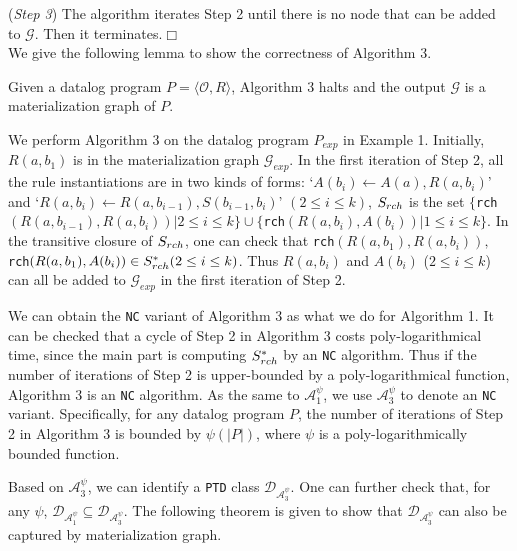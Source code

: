 \documentclass{article}
\begin{document}
(\emph{Step 3}) The algorithm iterates Step 2 until there is no node that can be added to $\mathcal{G}$. Then it terminates.\hfill$\Box$\\

We give the following lemma to show the correctness of Algorithm 3.

\begin{lemma}
Given a datalog program $P=\langle\mathcal{O}, R\rangle$, Algorithm 3 halts and the output $\mathcal{G}$ is a materialization graph of $P$.
\end{lemma}

\begin{example}
We perform Algorithm 3 on the datalog program $P_{exp}$ in Example 1. Initially, $R(a,b_1)$ is in the materialization graph $\mathcal{G}_{exp}$. In the first iteration of Step 2, all the rule instantiations are in two kinds of forms: `$A(b_{i})\leftarrow A(a),R(a,b_{i})$' and `$R(a,b_i)\leftarrow R(a,b_{i-1}),S(b_{i-1},b_i)$' $(2\leq i\leq k)$, $S_{\tiny rch}$ is the set $\{$\texttt{rch}$(R(a,b_{i-1}), R(a,b_i))|2\leq i\leq k\}\cup\{$\texttt{rch}$(R(a,b_i), A(b_i))|1\leq i\leq k\}$. In the transitive closure of $S_{\tiny rch}$,
one can check that \texttt{rch}$(R(a,b_1), R(a,b_i)),$\texttt{rch}$(R(a,b_1), A(b_i))\in S^*_{\tiny rch}(2\leq i\leq k)$. Thus $R(a,b_i)$ and $A(b_i)$ ($2\leq i\leq k$) can all be added to $\mathcal{G}_{exp}$ in the first iteration of Step 2.
\end{example}

We can obtain the \texttt{NC} variant of Algorithm 3 as what we do for Algorithm 1. It can be checked that a cycle
of Step 2 in Algorithm 3 costs poly-logarithmical time, since the main part is computing $S^*_{\tiny rch}$ by an \texttt{NC} algorithm. Thus if the number of iterations of Step 2 is upper-bounded by a poly-logarithmical function,
Algorithm 3 is an \texttt{NC} algorithm. As the same to $\mathcal{A}_1^{\psi}$, we use $\mathcal{A}_3^{\psi}$ to denote an \texttt{NC} variant. Specifically, for any datalog program $P$, the number of iterations of Step 2 in Algorithm 3 is
bounded by $\psi(|P|)$, where $\psi$ is a poly-logarithmically bounded function.

Based on $\mathcal{A}_3^{\psi}$, we can identify a \texttt{PTD} class $\mathcal{D}_{\mathcal{A}_3^{\psi}}$. One can further check that, for any $\psi$, $\mathcal{D}_{\mathcal{A}_1^{\psi}}\subseteq\mathcal{D}_{\mathcal{A}_3^{\psi}}$.
The following theorem is given to show that $\mathcal{D}_{\mathcal{A}_3^{\psi}}$ can also be captured by materialization graph.
\end{document}
